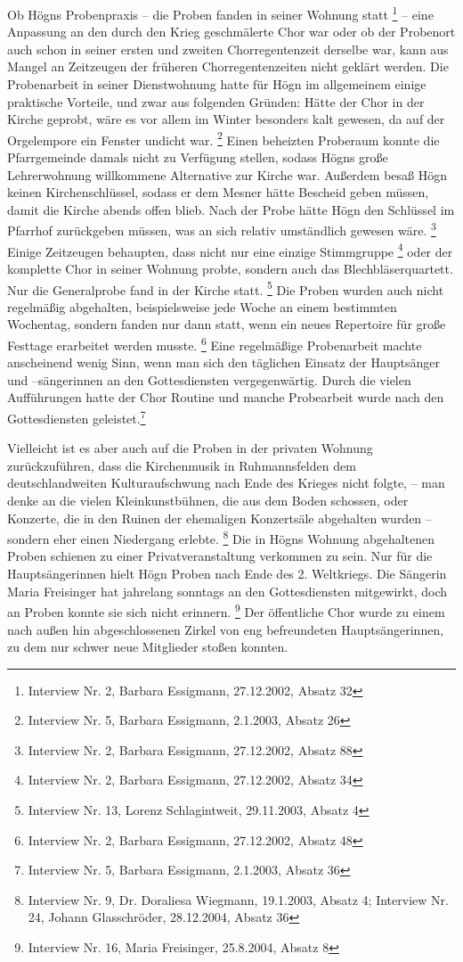 Ob Högns Probenpraxis – die Proben fanden in seiner Wohnung
statt \footnote{Interview Nr. 2, Barbara Essigmann, 27.12.2002, Absatz
32} – eine Anpassung an den durch den Krieg geschmälerte Chor war oder
ob der Probenort auch schon in seiner ersten und zweiten
Chorregentenzeit derselbe war, kann aus Mangel an Zeitzeugen der
früheren Chorregentenzeiten nicht geklärt werden. Die Probenarbeit in
seiner Dienstwohnung hatte für Högn im allgemeinem einige praktische
Vorteile, und zwar aus folgenden Gründen: Hätte der Chor in der Kirche
geprobt, wäre es vor allem im Winter besonders kalt gewesen, da auf der
Orgelempore ein Fenster undicht war. \footnote{Interview Nr. 5, Barbara
Essigmann, 2.1.2003, Absatz 26} Einen beheizten Proberaum konnte die
Pfarrgemeinde damals nicht zu Verfügung stellen, sodass Högns große
Lehrerwohnung willkommene Alternative zur Kirche war. Außerdem besaß
Högn keinen Kirchenschlüssel, sodass er dem Mesner hätte Bescheid geben
müssen, damit die Kirche abends offen blieb. Nach der Probe hätte Högn
den Schlüssel im Pfarrhof zurückgeben müssen, was an sich relativ
umständlich gewesen wäre. \footnote{Interview Nr. 2, Barbara Essigmann,
27.12.2002, Absatz 88} Einige Zeitzeugen behaupten, dass nicht nur eine
einzige Stimmgruppe \footnote{Interview Nr. 2, Barbara Essigmann,
27.12.2002, Absatz 34} oder der komplette Chor in seiner Wohnung
probte, sondern auch das Blechbläserquartett. Nur die Generalprobe fand
in der Kirche statt. \footnote{Interview Nr. 13, Lorenz Schlagintweit,
29.11.2003, Absatz 4} Die Proben wurden auch nicht regelmäßig
abgehalten, beispielsweise jede Woche an einem bestimmten Wochentag,
sondern fanden nur dann statt, wenn ein neues Repertoire für große
Festtage erarbeitet werden musste. \footnote{Interview Nr. 2, Barbara
Essigmann, 27.12.2002, Absatz 48} Eine regelmäßige Probenarbeit machte
anscheinend wenig Sinn, wenn man sich den täglichen Einsatz der
Hauptsänger und –sängerinnen an den Gottesdiensten vergegenwärtig.
Durch die vielen Aufführungen hatte der Chor Routine und manche
Probearbeit wurde nach den Gottesdiensten geleistet.\footnote{
Interview Nr. 5, Barbara Essigmann, 2.1.2003, Absatz 36}

Vielleicht ist es aber auch auf die Proben in der privaten Wohnung
zurückzuführen, dass die Kirchenmusik in Ruhmannsfelden dem
deutschlandweiten Kulturaufschwung nach Ende des Krieges nicht folgte,
– man denke an die vielen Kleinkunstbühnen, die aus dem Boden schossen,
oder Konzerte, die in den Ruinen der ehemaligen Konzertsäle abgehalten
wurden – sondern eher einen Niedergang erlebte. \footnote{Interview Nr.
9, Dr. Doraliesa Wiegmann, 19.1.2003, Absatz 4; Interview Nr. 24,
Johann Glasschröder, 28.12.2004, Absatz 36} Die in Högns Wohnung
abgehaltenen Proben schienen zu einer Privatveranstaltung verkommen zu
sein. Nur für die Hauptsängerinnen hielt Högn Proben nach Ende des 2.
Weltkriegs. Die Sängerin Maria Freisinger hat jahrelang sonntags an den
Gottesdiensten mitgewirkt, doch an Proben konnte sie sich nicht
erinnern. \footnote{Interview Nr. 16, Maria Freisinger, 25.8.2004,
Absatz 8} Der öffentliche Chor wurde zu einem nach außen hin
abgeschlossenen Zirkel von eng befreundeten Hauptsängerinnen, zu dem
nur schwer neue Mitglieder stoßen konnten.

